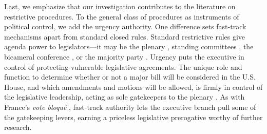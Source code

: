 \documentclass[letter,12pt]{article}
\begin{document}
Last, we emphasize that our investigation contributes to the literature on restrictive procedures. To the general class of procedures as instruments of political control, we add the urgency authority. One difference sets fast-track mechanisms apart from standard closed rules. Standard restrictive rules give agenda power to legislators---it may be the plenary \citep{mcnollgast.1987}, standing committees \citep{weingast.1992}, the bicameral conference \citep{shepsle.weingast.1987}, or the majority party \citep{cox.mccubbins.1997}. Urgency puts the executive in control of protecting vulnerable legislative agreements. The unique role and function to determine whether or not a major bill will be considered in the U.S. House, and which amendments and motions will be allowed, is firmly in control of the legislative leadership, acting as sole gatekeepers to the plenary \citep{cox.2006}. As with France's \emph{vote bloqu\'e} \citep{huber.1996b}, fast-track authority lets the executive branch pull some of the gatekeeping levers, earning a priceless legislative prerogative worthy of further research.



\end{document}
